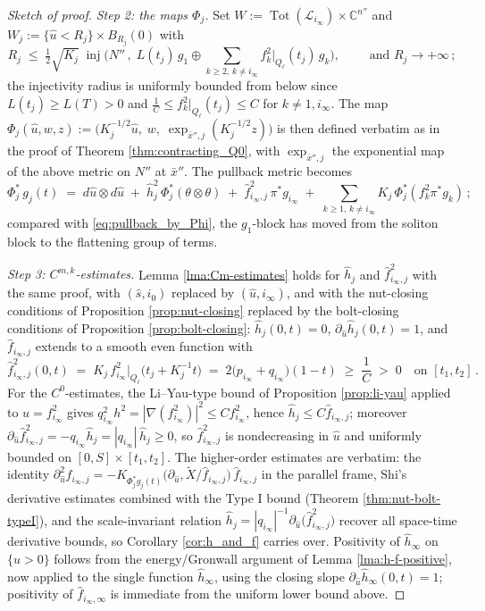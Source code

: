 \documentclass[11pt]{amsart}
\theoremstyle{plain}
\numberwithin{equation}{section}
\theoremstyle{definition}
\theoremstyle{remark}
\begin{document}
\begin{proof}[Sketch of proof]
\emph{Step 2: the maps $\Phi_j$.} Set $W := \operatorname{Tot}(\mathcal{L}_{i_\infty}) \times \mathbb{C}^{n''}$ and $W_j := \{\hat{u} < R_j\} \times B_{R_j}(0)$ with
\[R_j \;\leq\; \tfrac{1}{2}\sqrt{K_j}\;\operatorname{inj}\Big(N''\,, \; L(t_j)\,g_1 \oplus \sum_{k \geq 2,\, k \neq i_\infty} f_k^2\big|_{Q_\ell}(t_j)\,g_k\Big), \qquad \text{ and } R_j \to +\infty\,;\]
the injectivity radius is uniformly bounded from below since $L(t_j) \geq L(T) > 0$ and $\frac{1}{C} \leq f_k^2\big|_{Q_\ell}(t_j) \leq C$ for $k \neq 1, i_\infty$. The map $\Phi_j(\hat{u}, w, z) := \big(K_j^{-1/2}\hat{u}, \; w, \; \exp_{\bar{x}'',j}(K_j^{-1/2}z)\big)$ is then defined verbatim as in the proof of Theorem \ref{thm:contracting_Q0}, with $\exp_{\bar{x}'',j}$ the exponential map of the above metric on $N''$ at $\bar{x}''$. The pullback metric becomes
\[\Phi_j^* \, g_j (t) \;=\; d \hat{u} \otimes d \hat{u} \;+\; \hat{h}_j^2 \, \Phi_j^*(\theta \otimes \theta) \;+\; \hat{f}_{i_\infty, j}^2 \, \pi^* g_{i_\infty} \;+\; \sum_{k \geq 1, \, k \neq i_\infty} K_j \, \Phi_j^*(f_k^2 \pi^* g_k) \,;\]
compared with \eqref{eq:pullback_by_Phi}, the $g_1$-block has moved from the soliton block to the flattening group of terms.

\emph{Step 3: $C^{m,k}$-estimates.} Lemma \ref{lma:Cm-estimates} holds for $\hat{h}_j$ and $\hat{f}_{i_\infty,j}^2$ with the same proof, with $(\hat{s}, i_0)$ replaced by $(\hat{u}, i_\infty)$, and with the nut-closing conditions of Proposition \ref{prop:nut-closing} replaced by the bolt-closing conditions of Proposition \ref{prop:bolt-closing}: $\hat{h}_j(0,t) = 0$, $\partial_{\hat{u}}\hat{h}_j(0,t) = 1$, and $\hat{f}_{i_\infty,j}$ extends to a smooth even function with
\[\hat{f}_{i_\infty, j}^2(0,t) \;=\; K_j \, f_{i_\infty}^2\big|_{Q_\ell}\big(t_j + K_j^{-1}t\big) \;=\; 2\big(p_{i_\infty} + q_{i_\infty}\big)(1-t) \;\geq\; \frac{1}{C} \;>\; 0 \quad \text{on } [t_1,t_2]\,.\]
For the $C^0$-estimates, the Li--Yau-type bound of Proposition \ref{prop:li-yau} applied to $u = f_{i_\infty}^2$ gives $q_{i_\infty}^2 h^2 = |\nabla(f_{i_\infty}^2)|^2 \leq Cf_{i_\infty}^2$, hence $\hat{h}_j \leq C\hat{f}_{i_\infty,j}$; moreover $\partial_{\hat{u}}\hat{f}_{i_\infty,j}^2 = -q_{i_\infty}\hat{h}_j = |q_{i_\infty}|\,\hat{h}_j \geq 0$, so $\hat{f}_{i_\infty,j}^2$ is nondecreasing in $\hat{u}$ and uniformly bounded on $[0,S] \times [t_1,t_2]$. The higher-order estimates are verbatim: the identity $\partial^2_{\hat{u}}\hat{f}_{i_\infty,j} = -K_{\Phi_j^*g_j(t)}\big(\partial_{\hat{u}}, \widetilde{X}/\hat{f}_{i_\infty,j}\big)\,\hat{f}_{i_\infty,j}$ in the parallel frame, Shi's derivative estimates \cite{Shi} combined with the Type I bound (Theorem \ref{thm:nut-bolt-typeI}), and the scale-invariant relation $\hat{h}_j = |q_{i_\infty}|^{-1}\partial_{\hat{u}}\big(\hat{f}_{i_\infty,j}^2\big)$ recover all space-time derivative bounds, so Corollary \ref{cor:h_and_f} carries over. Positivity of $\hat{h}_\infty$ on $\{\hat{u} > 0\}$ follows from the energy/Gronwall argument of Lemma \ref{lma:h-f-positive}, now applied to the single function $\hat{h}_\infty$, using the closing slope $\partial_{\hat{u}}\hat{h}_\infty(0,t) = 1$; positivity of $\hat{f}_{i_\infty,\infty}$ is immediate from the uniform lower bound above.


\end{proof}
\end{document}
